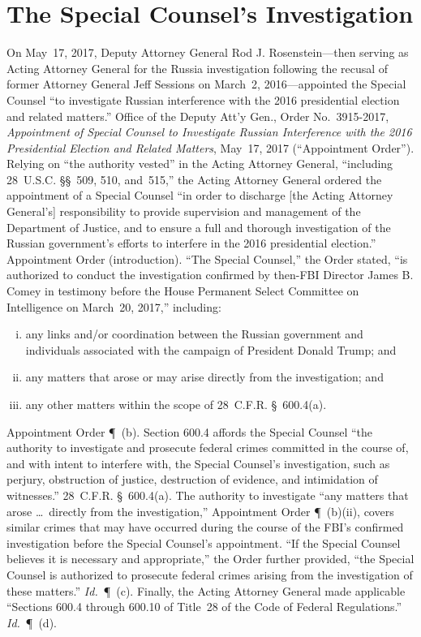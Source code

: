 \section{The Special Counsel's Investigation}

On May~17, 2017, Deputy Attorney General Rod J. Rosenstein---then serving as Acting Attorney General for the Russia investigation following the recusal of former Attorney General Jeff Sessions on March~2, 2016---appointed the Special Counsel ``to investigate Russian interference with the 2016 presidential election and related matters.''
Office of the Deputy Att'y Gen., Order No.~3915-2017, \textit{Appointment of Special Counsel to Investigate Russian Interference with the 2016 Presidential Election and Related Matters}, May~17, 2017 (``Appointment Order'').
Relying on ``the authority vested'' in the Acting Attorney General, ``including 28~U.S.C. \S\S~509, 510, and~515,'' the Acting Attorney General ordered the appointment of a Special Counsel ``in order to discharge [the Acting Attorney General's] responsibility to provide supervision and management of the Department of Justice, and to ensure a full and thorough investigation of the Russian government's efforts to interfere in the 2016 presidential election.'' Appointment Order (introduction).
``The Special Counsel,'' the Order stated, ``is authorized to conduct the investigation confirmed by then-FBI Director James B. Comey in testimony before the House Permanent Select Committee on Intelligence on March~20, 2017,'' including:

\begin{enumerate}[(i)]
  \item any links and/or coordination between the Russian government and individuals associated with the campaign of President Donald Trump; and
  \item any matters that arose or may arise directly from the investigation; and
  \item any other matters within the scope of 28~C.F.R. \S~600.4(a).
\end{enumerate}

Appointment Order \P~(b). Section 600.4 affords the Special Counsel ``the authority to investigate and prosecute federal crimes committed in the course of, and with intent to interfere with, the Special Counsel's investigation, such as perjury, obstruction of justice, destruction of evidence, and intimidation of witnesses.'' 28~C.F.R. \S~600.4(a).
The authority to investigate ``any matters that arose \dots\ directly from the investigation,'' Appointment Order \P~(b)(ii), covers similar crimes that may have occurred during the course of the FBI's confirmed investigation before the Special Counsel's appointment.
``If the Special Counsel believes it is necessary and appropriate,'' the Order further provided, ``the Special Counsel is authorized to prosecute federal crimes arising from the investigation of these matters.'' \textit{Id.}~\P~(c).
Finally, the Acting Attorney General made applicable ``Sections 600.4 through 600.10 of Title~28 of the Code of Federal Regulations.'' \textit{Id.}~\P~(d).

